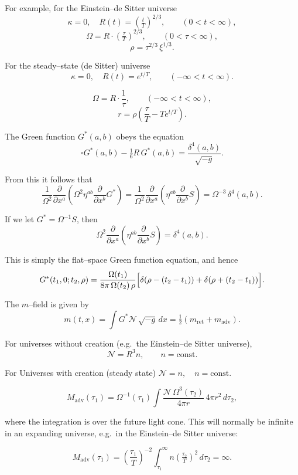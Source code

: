 For example, for the Einstein--de Sitter universe
\[
\kappa = 0, \quad 
R(t) = \left(\tfrac{t}{T}\right)^{2/3}, 
\qquad (0 < t < \infty),
\]
\[
\Omega = R \cdot \left(\tfrac{\tau}{T}\right)^{2/3}, 
\qquad (0 < \tau < \infty),
\]
\[
\rho = \tau^{2/3}\, \xi^{1/3}.
\]

For the steady--state (de Sitter) universe
\[
\kappa = 0, \quad R(t) = e^{t/T}, 
\qquad (-\infty < t < \infty).
\]

\[
\Omega = R \cdot \frac{1}{\tau}, 
\qquad (-\infty < t < \infty),
\]
\[
r = \rho \left( \frac{\tau}{T} - T e^{t/T} \right).
\]

The Green function \( G^{*}(a,b) \) obeys the equation
\[
\square G^{*}(a,b) - \tfrac{1}{6} R\, G^{*}(a,b) 
= \frac{\delta^{4}(a,b)}{\sqrt{-g}}.
\]

From this it follows that
\[
\frac{1}{\Omega^{2}} \frac{\partial}{\partial x^{a}}
\left( \Omega^{2} \eta^{ab} \frac{\partial}{\partial x^{b}} G^{*} \right)
= \frac{1}{\Omega^{2}} \frac{\partial}{\partial x^{a}}
\left( \eta^{ab} \frac{\partial}{\partial x^{b}} S \right)
= \Omega^{-3}\, \delta^{4}(a,b).
\]

If we let \( G^{*} = \Omega^{-1} S \), then
\[
\Omega^{2} \frac{\partial}{\partial x^{a}}
\left( \eta^{ab} \frac{\partial}{\partial x^{b}} S \right)
= \delta^{4}(a,b).
\]

This is simply the flat--space Green function equation, and hence
\[
G^{*}(t_{1},0; t_{2},\rho) 
= \frac{\Omega(t_{1})}{8\pi \, \Omega(t_{2}) \, \rho}
\Bigl[ \delta(\rho - (t_{2}-t_{1})) + \delta(\rho + (t_{2}-t_{1})) \Bigr].
\]

The \(m\)--field is given by
\[
m(t,x) = \int G^{*} \mathcal{N}\, \sqrt{-g}\, dx
= \tfrac{1}{2}(m_{\text{ret}} + m_{\text{adv}}).
\]

For universes without creation (e.g.\ the Einstein--de Sitter universe),
\[
\mathcal{N} = R^{3} n, \qquad n = \text{const.}
\]

For Universes with creation (steady state) 
\(\mathcal{N} = n, \quad n = \text{const.}\)

\[
M_{\text{adv}}(\tau_{1}) = \Omega^{-1}(\tau_{1}) 
\int \frac{\mathcal{N}\,\Omega^{3}(\tau_{2})}{4\pi r}\, 4\pi r^{2}\, d\tau_{2},
\]

where the integration is over the future light cone. 
This will normally be infinite in an expanding universe, e.g.\ in the Einstein--de Sitter universe:

\[
M_{\text{adv}}(\tau_{1}) 
= \left(\frac{\tau_{1}}{T}\right)^{-2} 
\int_{\tau_{1}}^{\infty} n \left(\tfrac{\tau_{2}}{T}\right)^{2}\, d\tau_{2}
= \infty.
\]

